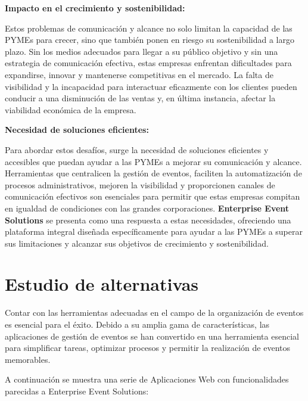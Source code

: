\textbf{Impacto en el crecimiento y sostenibilidad:}

Estos problemas de comunicación y alcance no solo limitan la capacidad de las PYMEs para crecer, sino que también ponen en riesgo su sostenibilidad 
a largo plazo. Sin los medios adecuados para llegar a su público objetivo y sin una estrategia de comunicación efectiva, estas empresas enfrentan 
dificultades para expandirse, innovar y mantenerse competitivas en el mercado. La falta de visibilidad y la incapacidad para interactuar eficazmente 
con los clientes pueden conducir a una disminución de las ventas y, en última instancia, afectar la viabilidad económica de la empresa.

\textbf{Necesidad de soluciones eficientes:}

Para abordar estos desafíos, surge la necesidad de soluciones eficientes y accesibles que puedan ayudar a las PYMEs a mejorar su comunicación y alcance. 
Herramientas que centralicen la gestión de eventos, faciliten la automatización de procesos administrativos, mejoren la visibilidad y proporcionen canales 
de comunicación efectivos son esenciales para permitir que estas empresas compitan en igualdad de condiciones con las grandes corporaciones. 
\textbf{Enterprise Event Solutions} se presenta como una respuesta a estas necesidades, ofreciendo una plataforma integral diseñada específicamente 
para ayudar a las PYMEs a superar sus limitaciones y alcanzar sus objetivos de crecimiento y sostenibilidad.


\section{Estudio de alternativas}
Contar con las herramientas adecuadas en el campo de la organización de eventos es esencial para el éxito. Debido a su amplia gama de características, 
las aplicaciones de gestión de eventos se han convertido en una herramienta esencial para simplificar tareas, optimizar procesos y 
permitir la realización de eventos memorables.

A continuación se muestra una serie de Aplicaciones Web con funcionalidades parecidas a Enterprise Event Solutions:

